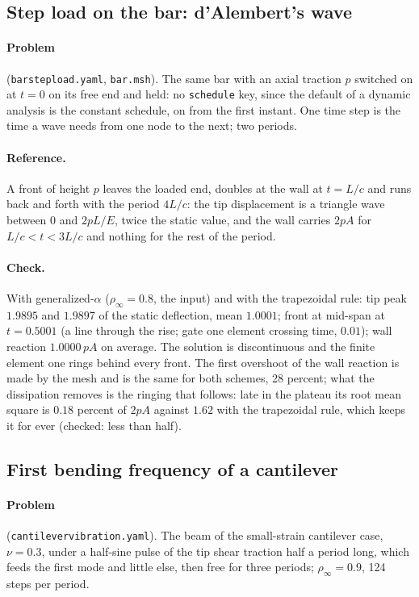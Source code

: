 \documentclass[11pt]{article}
\DeclareRobustCommand{\code}[1]{{\def\_{\textunderscore\allowbreak}\texttt{#1}}}
\DeclareRobustCommand{\file}[1]{{\def\_{\textunderscore\allowbreak}\texttt{#1}}}
\begin{document}
\subsection{Step load on the bar: d'Alembert's wave}
\paragraph{Problem} (\file{bar\_step\_load.yaml}, \file{bar.msh}).  The same
bar with an axial traction $p$ switched on at $t = 0$ on its free end and
held: no \code{schedule} key, since the default of a dynamic analysis is the
constant schedule, on from the first instant.  One time step is the time a
wave needs from one node to the next; two periods.
\paragraph{Reference.}  A front of height $p$ leaves the loaded end, doubles
at the wall at $t = L/c$ and runs back and forth with the period $4L/c$: the
tip displacement is a triangle wave between $0$ and $2pL/E$, twice the
static value, and the wall carries $2pA$ for $L/c < t < 3L/c$ and nothing for
the rest of the period.
\paragraph{Check.}  With generalized-$\alpha$ ($\rho_\infty = 0.8$, the
input) and with the trapezoidal rule: tip peak $1.9895$ and $1.9897$ of the
static deflection, mean $1.0001$; front at mid-span at $t = 0.5001$ (a line
through the rise; gate one element crossing time, $0.01$); wall reaction
$1.0000\,pA$ on average.  The solution is discontinuous and the finite
element one rings behind every front.  The first overshoot of the wall
reaction is made by the mesh and is the same for both schemes, 28 percent;
what the dissipation removes is the ringing that follows: late in the
plateau its root mean square is $0.18$ percent of $2pA$ against $1.62$ with
the trapezoidal rule, which keeps it for ever (checked: less than half).

\subsection{First bending frequency of a cantilever}
\paragraph{Problem} (\file{cantilever\_vibration.yaml}).  The beam of the
small-strain cantilever case, $\nu = 0.3$, under a half-sine pulse of the
tip shear traction half a period long, which feeds the first mode and
little else, then free for three periods; $\rho_\infty = 0.9$, 124 steps per
period.
\end{document}
